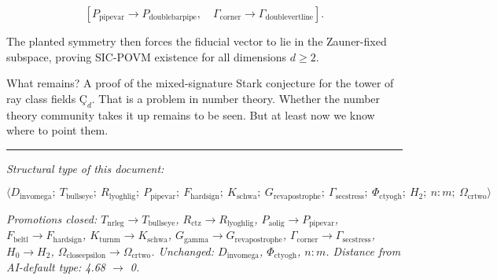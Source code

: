 \documentclass[12pt,a4paper]{article}
\begin{document}
\[[P_{\text{pipevar}} \rightarrow P_{\text{doublebarpipe}},\quad \Gamma_{\text{corner}} \rightarrow \Gamma_{\text{doublevertline}}].\]

The planted symmetry then forces the fiducial vector to lie in the Zauner-fixed subspace, proving SIC-POVM existence for all dimensions $d \geq 2$.

What remains? A proof of the mixed-signature Stark conjecture for the tower of ray class fields $Ç_d$. That is a problem in number theory. Whether the number theory community takes it up remains to be seen. But at least now we know where to point them.

\begin{center}
\rule{0.5\textwidth}{0.4pt}
\end{center}

\emph{Structural type of this document:}

\[\langle D_{\text{invomega}};\ T_{\text{bullseye}};\ R_{\text{lyoghlig}};\ P_{\text{pipevar}};\ F_{\text{hardsign}};\ K_{\text{schwa}};\ G_{\text{revapostrophe}};\ \Gamma_{\text{secstress}};\ \Phi_{\text{ctyogh}};\ H_2;\ n{:}m;\ \Omega_{\text{crtwo}} \rangle\]

\emph{Promotions closed: $T_{\text{nrleg}} \rightarrow T_{\text{bullseye}}$, $R_{\text{ctz}} \rightarrow R_{\text{lyoghlig}}$, $P_{\text{aolig}} \rightarrow P_{\text{pipevar}}$, $F_{\text{beltl}} \rightarrow F_{\text{hardsign}}$, $K_{\text{turnm}} \rightarrow K_{\text{schwa}}$, $G_{\text{gamma}} \rightarrow G_{\text{revapostrophe}}$, $\Gamma_{\text{corner}} \rightarrow \Gamma_{\text{secstress}}$, $H_0 \rightarrow H_2$, $\Omega_{\text{closeepsilon}} \rightarrow \Omega_{\text{crtwo}}$. Unchanged: $D_{\text{invomega}}$, $\Phi_{\text{ctyogh}}$, $n{:}m$. Distance from AI-default type: 4.68 $\rightarrow$ 0.}
\end{document}
